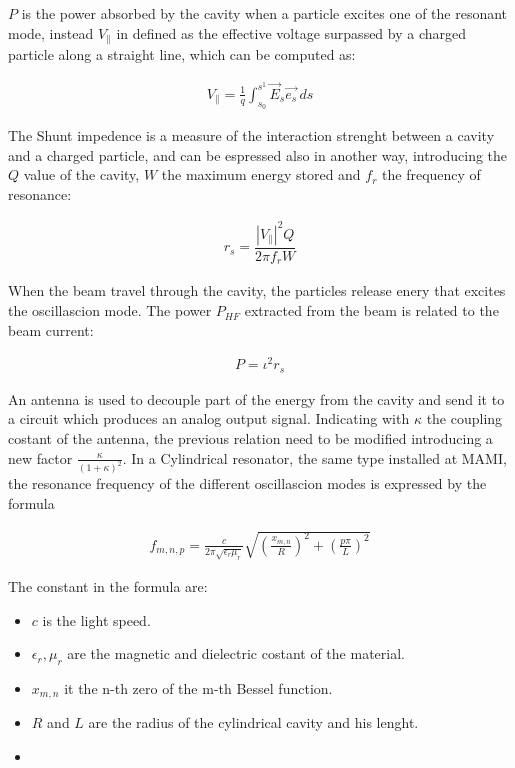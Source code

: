 $P$ is the power absorbed by the cavity when a particle excites one of the resonant mode, instead $V_{\|}$ in defined as the effective voltage surpassed by a charged particle along a straight line, which can be computed as:

\begin{align*}
V_{\|} = \frac{1}{q}  \int_{s_{0}}^{s^{1}} \vec{E}_{s} \vec{e_{s}} \,ds
\end{align*}

The Shunt impedence is a measure of the interaction strenght between a cavity and a charged particle, and can be espressed also in another way, introducing the $Q$ value of the cavity, $W$ the maximum energy stored and $f_{r}$ the frequency of resonance:

\begin{align*}
r_{s} = \dfrac{|V_{\|}|^{2} Q}{2 \pi f_{r} W}
\end{align*}

When the beam travel through the cavity, the particles release enery that excites the oscillascion mode. The power $P_{HF}$ extracted from the beam is related to the beam current: 

\begin{align*}
P = \iota^{2} r_{s}
\end{align*}

An antenna is used to decouple part of the energy from the cavity and send it to a circuit which produces an analog output signal. Indicating with $\kappa$ the coupling costant of the antenna, the previous relation need to be modified introducing a new factor $ \frac{\kappa}{(1 + \kappa)^2}$. In a Cylindrical resonator, the same type installed at MAMI, the resonance frequency of the different oscillascion modes is expressed by the formula 

\begin{align*}
f_{m,n,p} = \frac{c}{2\pi \sqrt{\epsilon_{r} \mu_{r}}} \sqrt{(\frac{x_{m,n}}{R})^{2} + (\frac{p \pi}{L})^{2}}
\end{align*}

The constant in the formula are:

\begin{itemize}
\item $c$ is the light speed.
\item $\epsilon_{r}, \mu_{r}$ are the magnetic and dielectric costant of the material.
\item $x_{m,n}$ it the n-th zero of the m-th Bessel function.
\item $R$ and $L$ are the radius of the cylindrical cavity and his lenght.
\item {}
\end{itemize}

